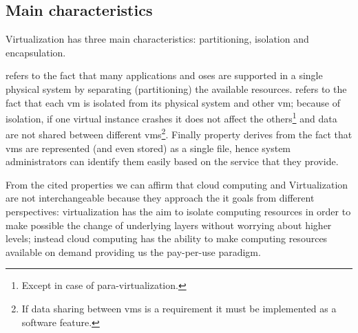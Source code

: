 \subsection{Main characteristics}
\label{sec:background-virtualization-characteristics}
Virtualization has three main characteristics: partitioning, isolation and encapsulation.

 refers to the fact that many applications and \acs{os}es are supported in a single 
physical system by separating (partitioning) the available resources.  refers to the
fact that each \ac{vm} is isolated from its physical system and other \ac{vm}; because of isolation, if
one virtual instance crashes it does not affect the others\footnote{Except in case of para-virtualization.}
and data are not shared between different \ac{vm}s\footnote{If data sharing between \ac{vm}s is a requirement
it must be implemented as a software feature.}. Finally  property derives from
the fact that \ac{vm}s are represented (and even stored) as a single file, hence system administrators
can identify them easily based on the service that they provide.

From the cited properties we can affirm that cloud computing and Virtualization are not interchangeable
because they approach the \acs{it} goals from different perspectives: virtualization has the aim to
isolate computing resources in order to make possible the change of underlying layers without worrying
about higher levels; instead cloud computing has the ability to make computing resources available on
demand providing us the pay-per-use paradigm.